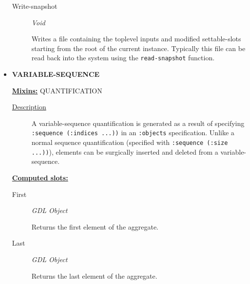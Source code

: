 \documentclass [11pt]{book}
\begin{document}
\begin{itemize}
\begin{description}
\item [Write-snapshot]
\emph{Void}

 Writes a file containing the toplevel inputs and modified settable-slots starting from the root of the
current instance. Typically this file can be read back into the system using the \texttt{read-snapshot} function.




\end{description}







\item {}
\label{prim:variable-sequence}
\textbf{VARIABLE-SEQUENCE}


\textbf{
\underline{Mixins:}} QUANTIFICATION





\begin{description}

\item [
\underline{Description}]


A variable-sequence quantification is generated as a result of specifying 
\texttt{:sequence (:indices ...))} in an \texttt{:objects} specification. Unlike a normal sequence quantification (specified
with \texttt{:sequence (:size ...))}), elements can be surgically inserted and deleted from a variable-sequence.



\end{description}








\textbf{
\underline{Computed slots:}}

\begin{description}

\item [First]
\emph{GDL Object}

 Returns the first element of the aggregate.




\item [Last]
\emph{GDL Object}

 Returns the last element of the aggregate.




\end{description}







\end{itemize}
\end{document}
